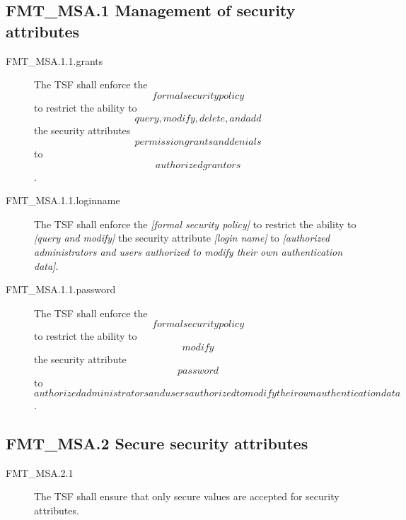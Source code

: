 \documentclass[12pt,english]{scrbook}
\begin{document}




\subsection{FMT{\_}MSA.1 Management of security attributes}
\begin{description}
\item[FMT{\_}MSA.1.1.grants]
    The TSF shall enforce the \emph{\[formal security policy\]} to restrict the
    ability to \emph{\[query, modify, delete, and add\]} the security
    attributes \emph{\[permission grants and denials\]} to \emph{\[authorized
    grantors\]}.

\item[FMT{\_}MSA.1.1.loginname]
    The TSF shall enforce the \emph{{[}formal security policy]} to restrict the
    ability to \emph{{[}query and modify]} the security attribute
    \emph{{[}login name]} to \emph{{[}authorized administrators and users
    authorized to modify their own authentication data]}.

\item[FMT{\_}MSA.1.1.password]
    The TSF shall enforce the \emph{\[formal security policy\]} to restrict
    the ability to \emph{\[modify\]} the security attribute
    \emph{\[password\]} to \emph{\[authorized administrators and users authorized to
    modify their own authentication data\]}.

\end{description}

\subsection{FMT{\_}MSA.2 Secure security attributes}

\begin{description}

\item[FMT{\_}MSA.2.1]

    The TSF shall ensure that only secure values are accepted for security
    attributes.

\end{description}

\end{document}
